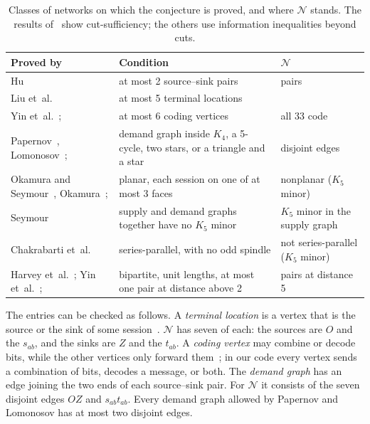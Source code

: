 \documentclass[11pt]{article}
\begin{document}
\begin{table}[ht]
\centering
\small
\renewcommand{\arraystretch}{1.2}
\begin{tabularx}{\linewidth}{@{}>{\raggedright\arraybackslash}p{4.2cm}>{\raggedright\arraybackslash}X>{\raggedright\arraybackslash}p{3.6cm}@{}}
\toprule
Proved by & Condition & $\mathcal N$\\
\midrule
Hu~\cite{Hu63} & at most 2 source--sink pairs & 7 pairs\\
Liu et~al.~\cite[Thm.~4]{LQLL26} & at most 5 terminal locations & 14\\
Yin et~al.~\cite{YLLW18}; \cite[Thm.~7]{LQLL26} & at most 6 coding vertices & all 33 code\\
Papernov~\cite{Pap76}, Lomonosov~\cite{Lom85}; \cite[Thm.~6]{LQLL26} & demand graph inside $K_4$, a 5-cycle, two stars, or a triangle and a star & 7 disjoint edges\\
Okamura and Seymour~\cite{OS81}, Okamura~\cite{Oka83}; \cite[Thm.~5]{LQLL26} & planar, each session on one of at most 3 faces & nonplanar ($K_5$ minor)\\
Seymour~\cite{Sey81} & supply and demand graphs together have no $K_5$ minor & $K_5$ minor in the supply graph\\
Chakrabarti et~al.~\cite{CFW12} & series-parallel, with no odd spindle & not series-parallel ($K_5$ minor)\\
Harvey et~al.~\cite{HKL06}; Yin et~al.~\cite{YLLW18}; \cite[Lemma~1]{LQLL26} & bipartite, unit lengths, at most one pair at distance above 2 & 7 pairs at distance 5\\
\bottomrule
\end{tabularx}
\caption{Classes of networks on which the conjecture is proved, and where $\mathcal N$ stands. The results of~\cite{Hu63,Pap76,Lom85,OS81,Oka83,Sey81,CFW12} show cut-sufficiency; the others use information inequalities beyond cuts.}
\label{tab:known}
\end{table}

The entries can be checked as follows. A \emph{terminal location} is a vertex that is the source or the sink of some session~\cite{LQLL26}. $\mathcal N$ has seven of each: the sources are $O$ and the $s_{ab}$, and the sinks are $Z$ and the $t_{ab}$. A \emph{coding vertex} may combine or decode bits, while the other vertices only forward them~\cite{LQLL26}; in our code every vertex sends a combination of bits, decodes a message, or both. The \emph{demand graph} has an edge joining the two ends of each source--sink pair. For $\mathcal N$ it consists of the seven disjoint edges $OZ$ and $s_{ab}t_{ab}$. Every demand graph allowed by Papernov and Lomonosov has at most two disjoint edges.
\end{document}
